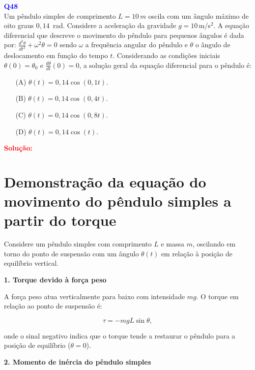 \documentclass[a4paper,12pt]{article}
\begin{document}
\begin{flushleft}
\textbf{\textcolor{blue}{\Large Q48}}\\
\noindent
Um pêndulo simples de comprimento \( L = 10\,m \) oscila com um ângulo máximo de oito graus \( 0{,}14\,\) rad.  
Considere a aceleração da gravidade \( g = 10\,\)m/s\(^2\). A equação diferencial que descreve o movimento do pêndulo para pequenos ângulos é dada por:
$\frac{d^2\theta}{dt^2} + \omega^2 \theta = 0$ sendo \( \omega \) a frequência angular do pêndulo e \( \theta \) o ângulo de deslocamento em função do tempo \( t \).  
Considerando as condições iniciais \( \theta(0) = \theta_0 \) e \( \frac{d\theta}{dt}(0) = 0 \), a solução geral da equação diferencial para o pêndulo é:

\begin{itemize}
\item[(A)] \( \theta(t) = 0{,}14\cos(0{,}1t) \).
\item[(B)] \( \theta(t) = 0{,}14\cos(0{,}4t) \).
\item[(C)] \( \theta(t) = 0{,}14\cos(0{,}8t) \).
\item[(D)] \( \theta(t) = 0{,}14\cos(t) \).
\end{itemize}

\vspace{0.5cm}

\textcolor{red}{\textbf{Solução:}}\\

\section*{Demonstração da equação do movimento do pêndulo simples a partir do torque}

Considere um pêndulo simples com comprimento \(L\) e massa \(m\), oscilando em torno do ponto de suspensão com um ângulo \(\theta(t)\) em relação à posição de equilíbrio vertical.

\bigskip

\textbf{1. Torque devido à força peso}

A força peso atua verticalmente para baixo com intensidade \(mg\). O torque em relação ao ponto de suspensão é:

\[
\boxed{\tau = - m g L \sin\theta,}
\]

onde o sinal negativo indica que o torque tende a restaurar o pêndulo para a posição de equilíbrio (\(\theta = 0\)).

\bigskip

\textbf{2. Momento de inércia do pêndulo simples}


\end{flushleft}
\end{document}
